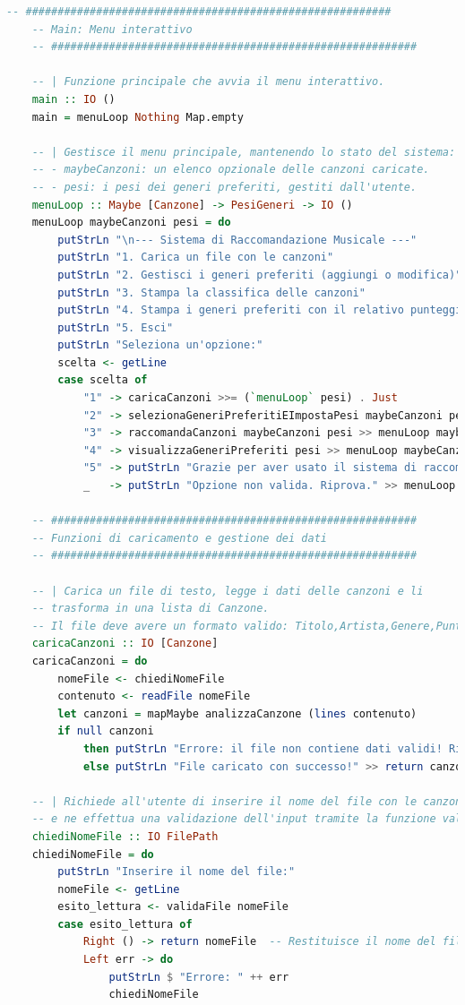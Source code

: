 \documentclass[a4paper,11pt]{article}
\begin{document}
\begin{lstlisting}[language=Haskell,caption=raccomandazioni.hs]
    -- #########################################################
    -- Main: Menu interattivo
    -- #########################################################
    
    -- | Funzione principale che avvia il menu interattivo.
    main :: IO ()
    main = menuLoop Nothing Map.empty
    
    -- | Gestisce il menu principale, mantenendo lo stato del sistema:
    -- - maybeCanzoni: un elenco opzionale delle canzoni caricate.
    -- - pesi: i pesi dei generi preferiti, gestiti dall'utente.
    menuLoop :: Maybe [Canzone] -> PesiGeneri -> IO ()
    menuLoop maybeCanzoni pesi = do
        putStrLn "\n--- Sistema di Raccomandazione Musicale ---"
        putStrLn "1. Carica un file con le canzoni"
        putStrLn "2. Gestisci i generi preferiti (aggiungi o modifica)"
        putStrLn "3. Stampa la classifica delle canzoni"
        putStrLn "4. Stampa i generi preferiti con il relativo punteggio"
        putStrLn "5. Esci"
        putStrLn "Seleziona un'opzione:"
        scelta <- getLine
        case scelta of
            "1" -> caricaCanzoni >>= (`menuLoop` pesi) . Just
            "2" -> selezionaGeneriPreferitiEImpostaPesi maybeCanzoni pesi >>= menuLoop maybeCanzoni
            "3" -> raccomandaCanzoni maybeCanzoni pesi >> menuLoop maybeCanzoni pesi
            "4" -> visualizzaGeneriPreferiti pesi >> menuLoop maybeCanzoni pesi
            "5" -> putStrLn "Grazie per aver usato il sistema di raccomandazione. Arrivederci!"
            _   -> putStrLn "Opzione non valida. Riprova." >> menuLoop maybeCanzoni pesi
    
    -- #########################################################
    -- Funzioni di caricamento e gestione dei dati
    -- #########################################################
    
    -- | Carica un file di testo, legge i dati delle canzoni e li
    -- trasforma in una lista di Canzone.
    -- Il file deve avere un formato valido: Titolo,Artista,Genere,Punteggio.
    caricaCanzoni :: IO [Canzone]
    caricaCanzoni = do
        nomeFile <- chiediNomeFile
        contenuto <- readFile nomeFile
        let canzoni = mapMaybe analizzaCanzone (lines contenuto)
        if null canzoni
            then putStrLn "Errore: il file non contiene dati validi! Riprova." >> caricaCanzoni
            else putStrLn "File caricato con successo!" >> return canzoni
    
    -- | Richiede all'utente di inserire il nome del file con le canzoni
    -- e ne effettua una validazione dell'input tramite la funzione validaFile.
    chiediNomeFile :: IO FilePath
    chiediNomeFile = do
        putStrLn "Inserire il nome del file:"
        nomeFile <- getLine
        esito_lettura <- validaFile nomeFile
        case esito_lettura of
            Right () -> return nomeFile  -- Restituisce il nome del file se valido
            Left err -> do
                putStrLn $ "Errore: " ++ err
                chiediNomeFile
    

\end{lstlisting}
\end{document}
